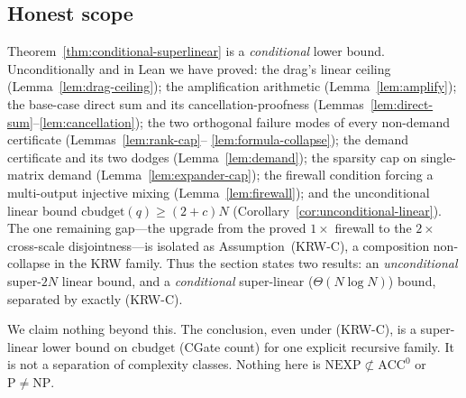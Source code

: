 \subsection{Honest scope}

Theorem~\ref{thm:conditional-superlinear} is a \emph{conditional} lower bound.
Unconditionally and in Lean we have proved: the drag's linear ceiling
(Lemma~\ref{lem:drag-ceiling}); the amplification arithmetic
(Lemma~\ref{lem:amplify}); the base-case direct sum and its cancellation-proofness
(Lemmas~\ref{lem:direct-sum}--\ref{lem:cancellation}); the two orthogonal failure
modes of every non-demand certificate (Lemmas~\ref{lem:rank-cap}--%
\ref{lem:formula-collapse}); the demand certificate and its two dodges
(Lemma~\ref{lem:demand}); the sparsity cap on single-matrix demand
(Lemma~\ref{lem:expander-cap}); the firewall condition forcing a multi-output
injective mixing (Lemma~\ref{lem:firewall}); and the unconditional linear bound
$\mathrm{cbudget}(q)\ge(2+c)N$ (Corollary~\ref{cor:unconditional-linear}).  The one
remaining gap---the upgrade from the proved $1\times$ firewall to the $2\times$
cross-scale disjointness---is isolated as Assumption~(KRW-C), a composition
non-collapse in the KRW family.  Thus the section states two results: an
\emph{unconditional} super-$2N$ linear bound, and a \emph{conditional}
super-linear ($\Theta(N\log N)$) bound, separated by exactly (KRW-C).

We claim nothing beyond this.  The conclusion, even under (KRW-C), is a
super-linear lower bound on $\mathrm{cbudget}$ (CGate count) for one explicit
recursive family.  It is not a separation of complexity classes.  Nothing here is
$\mathrm{NEXP}\not\subset\mathrm{ACC}^0$ or $\mathrm{P}\neq\mathrm{NP}$.
